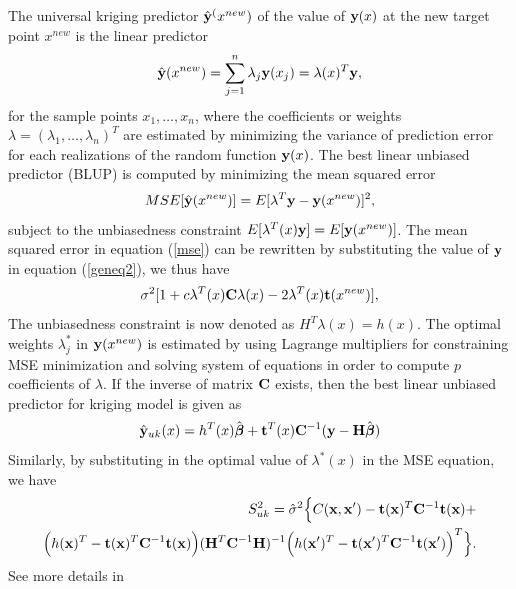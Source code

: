 \documentclass[12pt,titlepage]{report}
\newcommand{\bt}{{\bf t}}
\newcommand{\bH}{{\bf H}}
\newcommand{\bC}{{\bf C}}
\newcommand{\bx}{{\bf x}}
\newcommand{\by}{{\bf y}}
\newcommand{\hby}{{\hat {\bf y}}}
\newcommand{\hbbeta}{{\hat{\boldsymbol{\beta}}}}
\newcommand{\balpha}{{\boldsymbol{\alpha}}}
\theoremstyle{definition}
\theoremstyle{remark}
\begin{document}
The universal kriging predictor $\hby^(x^{new})$ of the value of $\by(x)$ at the new target point $x^{new}$ is the linear predictor
\begin{equation}
\hby(x^{new})=\sum_{j=1}^n \lambda_j \by (x_j)=\lambda(x)^T\by,
\end{equation}
for the sample points $x_1, \ldots , x_n$, where the coefficients or weights $\lambda=(\lambda_1, \ldots, \lambda_n)^T$ are estimated by minimizing the variance of prediction error for each realizations of the random function $\by(x)$. The best linear unbiased predictor (BLUP) is computed by minimizing the mean squared error
\begin{equation}\label{mse}
MSE[\hby(x^{new})]=E[\lambda^T\by-\by(x^{new})]^2,
\end{equation}
subject to the unbiasedness constraint $E[\lambda^T(x)\by] = E[\by(x^{new})]$. The mean squared error in equation (\ref{mse}) can be rewritten by substituting the value of $\by$ in equation (\ref{geneq2}), we thus have 
\begin{equation}
\sigma^2[1 + c\lambda^T(x)\bC\lambda(x) - 2\lambda^T(x)\bt(x^{new})],
\end{equation}
The unbiasedness constraint is now denoted as $H^T\lambda(x) = h(x)$. 
The optimal weights $\lambda^{*}_j$ in $\by(x^{new})$ is estimated by using Lagrange multipliers for constraining MSE minimization and solving system of equations in order to compute $p$ coefficients of $\lambda$.
If the inverse of matrix $\bC$ exists, then the best linear unbiased predictor for kriging model is given as
\begin{equation}
\hby_{uk}(x) = h^T(x)\hbbeta+ \bt^T(x)\bC^{-1}(\by -\bH\hbbeta)
\end{equation}
Similarly, by substituting in the optimal value of $\lambda^*(x)$ in the MSE equation, we have
\begin{multline}\label{olu2b}%
\begin{split}
S^2_{uk}=\hat \sigma^2 \Big \{C(\bx,\bx') -\bt(\bx)^T\bC^{-1} \bt(\bx) + \\ \Big ( h(\bx)^T-\bt(\bx)^T\bC^{-1}\bt(\bx) \Big )
(\bH^T\bC^{-1}\bH)^{-1}\Big (h(\bx')^T-\bt(\bx')^T\bC^{-1}\bt(\bx') \Big )^T
\Big \}.
\end{split}
\end{multline}
See more details in \citep{pd4,pd5}
\end{document}
